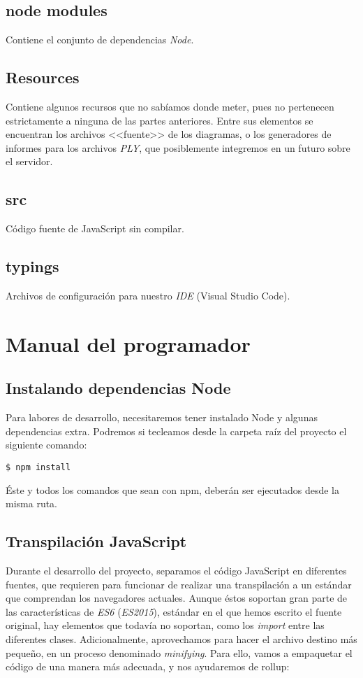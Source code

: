 \subsection{node modules}
Contiene el conjunto de dependencias \textit{Node}.

\subsection{Resources}
Contiene algunos recursos que no sabíamos donde meter, pues no pertenecen estrictamente a ninguna de las partes anteriores. Entre sus elementos se encuentran los archivos <<fuente>> de los diagramas, o los generadores de informes para los archivos \textit{PLY}, que posiblemente integremos en un futuro sobre el servidor.

\subsection{src}
Código fuente de JavaScript sin compilar.

\subsection{typings}
Archivos de configuración para nuestro \textit{IDE} (Visual Studio Code).

\section{Manual del programador}\label{sec:manual-programador}

\subsection{Instalando dependencias Node}
Para labores de desarrollo, necesitaremos tener instalado Node y algunas dependencias extra. Podremos si tecleamos desde la carpeta raíz del proyecto el siguiente comando:

\noindent\verb|$ npm install|

Éste y todos los comandos que sean con npm, deberán ser ejecutados desde la misma ruta.

\subsection{Transpilación JavaScript}
Durante el desarrollo del proyecto, separamos el código JavaScript en diferentes fuentes, que requieren para funcionar de realizar una transpilación a un estándar que comprendan los navegadores actuales. Aunque éstos soportan gran parte de las características de \textit{ES6} (\textit{ES2015}), estándar en el que hemos escrito el fuente original, hay elementos que todavía no soportan, como los \textit{import} entre las diferentes clases. Adicionalmente, aprovechamos para hacer el archivo destino más pequeño, en un proceso denominado \textit{minifying}.
Para ello, vamos a empaquetar el código de una manera más adecuada, y nos ayudaremos de rollup:

